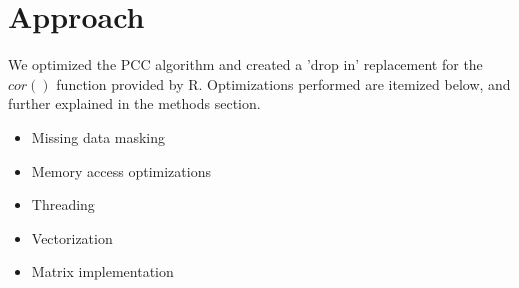 \documentclass{bioinfo}
\begin{document}
\section{Approach}
We optimized the PCC algorithm and created a 'drop in' replacement for the $cor()$ 
function provided by R. Optimizations performed are itemized below, and further 
explained in the methods section.

\begin{itemize}
\item Missing data masking
\item Memory access optimizations
\item Threading
\item Vectorization
\item Matrix implementation
\end{itemize}
\end{document}

